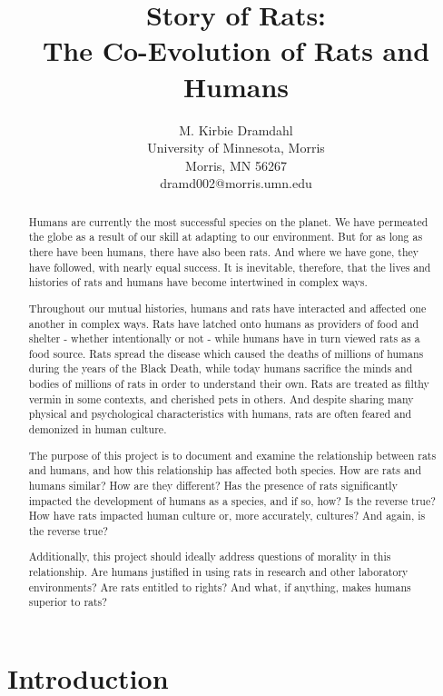 \documentclass[12pt]{article}
\title{Story of Rats:\\
       The Co-Evolution of Rats and Humans}
\author{
 		M. Kirbie Dramdahl\\
        University of Minnesota, Morris\\
        Morris, MN 56267\\
        dramd002@morris.umn.edu\\
}
\date{}
\begin{document}
\pagestyle{plain}

\maketitle

\begin{abstract}

Humans are currently the most successful species on the planet. We have permeated the globe as a result of our skill at adapting to our environment. But for as long as there have been humans, there have also been rats. And where we have gone, they have followed, with nearly equal success. It is inevitable, therefore, that the lives and histories of rats and humans have become intertwined in complex ways.

Throughout our mutual histories, humans and rats have interacted and affected one another in complex ways. Rats have latched onto humans as providers of food and shelter - whether intentionally or not - while humans have in turn viewed rats as a food source. Rats spread the disease which caused the deaths of millions of humans during the years of the Black Death, while today humans sacrifice the minds and bodies of millions of rats in order to understand their own. Rats are treated as filthy vermin in some contexts, and cherished pets in others. And despite sharing many physical and psychological characteristics with humans, rats are often feared and demonized in human culture.

The purpose of this project is to document and examine the relationship between rats and humans, and how this relationship has affected both species. How are rats and humans similar? How are they different? Has the presence of rats significantly impacted the development of humans as a species, and if so, how? Is the reverse true? How have rats impacted human culture or, more accurately, cultures? And again, is the reverse true?

Additionally, this project should ideally address questions of morality in this relationship. Are humans justified in using rats in research and other laboratory environments? Are rats entitled to rights? And what, if anything, makes humans superior to rats?

\end{abstract}

\section{Introduction} \label{Introduction}
\end{document}
